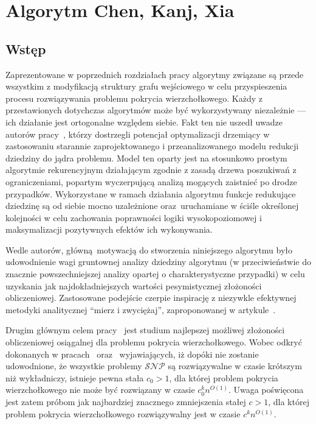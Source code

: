 \section{Algorytm Chen, Kanj, Xia}\label{s_ckx}
\subsection{Wstęp}
\par{
  Zaprezentowane w poprzednich rozdziałach pracy algorytmy związane są przede wszystkim z modyfikacją struktury grafu wejściowego w celu przyspieszenia procesu rozwiązywania problemu pokrycia wierzchołkowego.
  Każdy z przestawionych dotychczas algorytmów może być wykorzystywany niezależnie --- ich działanie jest ortogonalne względem siebie.
  Fakt ten nie uszedł uwadze autorów pracy~\cite{ImprovedBounds10}, którzy dostrzegli potencjał optymalizacji drzemiący w zastosowaniu starannie zaprojektowanego i przeanalizowanego modelu redukcji dziedziny do jądra problemu.
  Model ten oparty jest na stosunkowo prostym algorytmie rekurencyjnym działającym zgodnie z zasadą drzewa poszukiwań z ograniczeniami, popartym wyczerpującą analizą mogących zaistnieć po drodze przypadków.
  Wykorzystane w ramach działania algorytmu funkcje redukujące dziedzinę są od siebie mocno uzależnione oraz uruchamiane w ściśle określonej kolejności w celu zachowania poprawności logiki wysokopoziomowej i maksymalizacji pozytywnych efektów ich wykonywania.
}
\par{
  Wedle autorów, główną motywacją do stworzenia niniejszego algorytmu było udowodnienie wagi gruntownej analizy dziedziny algorytmu (w przeciwieństwie do znacznie powszechniejszej analizy opartej o charakterystyczne przypadki) w celu uzyskania jak najdokładniejszych wartości pesymistycznej złożoności obliczeniowej.
  Zastosowane podejście czerpie inspirację z niezywkle efektywnej metodyki analitycznej ``mierz i zwyciężaj'', zaproponowanej w artykule~\cite{conf/icalp/FominGK05}.

  Drugim głównym celem pracy~\cite{ImprovedBounds10} jest studium najlepszej możliwej złożoności obliczeniowej osiągalnej dla problemu pokrycia wierzchołkowego.
  Wobec odkryć dokonanych w pracach~\cite{Impagliazzo2001512} oraz~\cite{Cai2003789} wyjawiających, iż dopóki nie zostanie udowodnione, że wszystkie problemy $\mathcal{SNP}$ są rozwiązywalne w czasie krótszym niż wykładniczy, istnieje pewna stała $c_0 > 1$, dla której problem pokrycia wierzchołkowego nie może być rozwiązany w czasie $c_0^kn^{O(1)}$.
  Uwaga poświęcona jest zatem próbom jak najbardziej znacznego zmniejszenia stałej $c > 1$, dla której problem pokrycia wierzchołkowego rozwiązywalny jest w czasie $c^kn^{O(1)}$.
}
